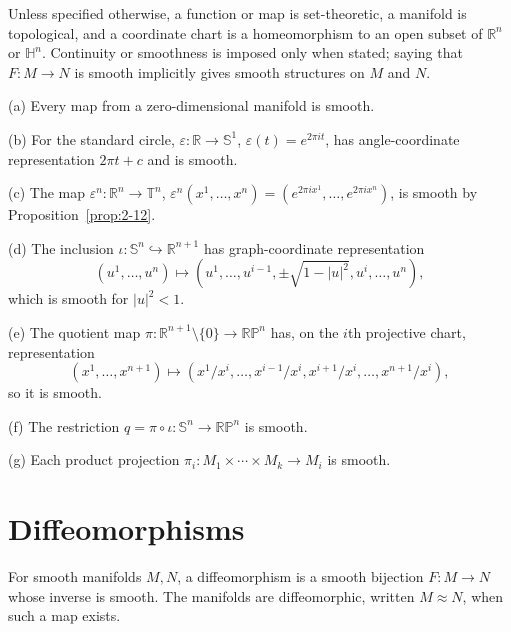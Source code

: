 \begin{remark}
\label{rem:2-8-extra-7}



Unless specified otherwise, a function or map is set-theoretic, a manifold is topological, and a coordinate chart is a homeomorphism to an open subset of $\mathbb R^n$ or $\mathbb H^n$. Continuity or smoothness is imposed only when stated; saying that $F:M\to N$ is smooth implicitly gives smooth structures on $M$ and $N$.
\end{remark}

\begin{example}
\label{ex:2-13}





(a) Every map from a zero-dimensional manifold is smooth.

(b) For the standard circle, $\varepsilon:\mathbb R\to\mathbb S^1$, $\varepsilon(t)=e^{2\pi it}$, has angle-coordinate representation $2\pi t+c$ and is smooth.

(c) The map $\varepsilon^n:\mathbb R^n\to\mathbb T^n$, $\varepsilon^n(x^1,\ldots,x^n)=(e^{2\pi ix^1},\ldots,e^{2\pi ix^n})$, is smooth by Proposition~\ref{prop:2-12}.

(d) The inclusion $\iota:\mathbb S^n\hookrightarrow\mathbb R^{n+1}$ has graph-coordinate representation
\[
(u^1,\ldots,u^n)\longmapsto(u^1,\ldots,u^{i-1},\pm\sqrt{1-|u|^2},u^i,\ldots,u^n),
\]
which is smooth for $|u|^2<1$.

(e) The quotient map $\pi:\mathbb R^{n+1}\setminus\{0\}\to\mathbb{RP}^n$ has, on the $i$th projective chart, representation
\[
(x^1,\ldots,x^{n+1})\longmapsto(x^1/x^i,\ldots,x^{i-1}/x^i,x^{i+1}/x^i,\ldots,x^{n+1}/x^i),
\]
so it is smooth.

(f) The restriction $q=\pi\circ\iota:\mathbb S^n\to\mathbb{RP}^n$ is smooth.

(g) Each product projection $\pi_i:M_1\times\cdots\times M_k\to M_i$ is smooth.
\end{example}

\section{Diffeomorphisms}

\begin{definition}
\label{def:2-9-extra-1}



For smooth manifolds $M,N$, a diffeomorphism is a smooth bijection $F:M\to N$ whose inverse is smooth. The manifolds are diffeomorphic, written $M\approx N$, when such a map exists.
\end{definition}


